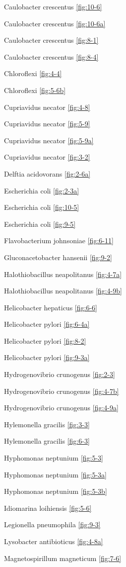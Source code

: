 \documentclass[]{tufte-book}
\begin{document}
Caulobacter crescentus \ref{fig:10-6}

Caulobacter crescentus \ref{fig:10-6a}

Caulobacter crescentus \ref{fig:8-1}

Caulobacter crescentus \ref{fig:8-4}

Chloroflexi \ref{fig:4-4}

Chloroflexi \ref{fig:5-6b}

Cupriavidus necator \ref{fig:4-8}

Cupriavidus necator \ref{fig:5-9}

Cupriavidus necator \ref{fig:5-9a}

Cupriavidus necator \ref{fig:3-2}

Delftia acidovorans \ref{fig:2-6a}

Escherichia coli \ref{fig:2-3a}

Escherichia coli \ref{fig:10-5}

Escherichia coli \ref{fig:9-5}

Flavobacterium johnsoniae \ref{fig:6-11}

Gluconacetobacter hansenii \ref{fig:9-2}

Halothiobacillus neapolitanus \ref{fig:4-7a}

Halothiobacillus neapolitanus \ref{fig:4-9b}

Helicobacter hepaticus \ref{fig:6-6}

Helicobacter pylori \ref{fig:6-4a}

Helicobacter pylori \ref{fig:8-2}

Helicobacter pylori \ref{fig:9-3a}

Hydrogenovibrio crunogenus \ref{fig:2-3}

Hydrogenovibrio crunogenus \ref{fig:4-7b}

Hydrogenovibrio crunogenus \ref{fig:4-9a}

Hylemonella gracilis \ref{fig:3-3}

Hylemonella gracilis \ref{fig:6-3}

Hyphomonas neptunium \ref{fig:5-3}

Hyphomonas neptunium \ref{fig:5-3a}

Hyphomonas neptunium \ref{fig:5-3b}

Idiomarina loihiensis \ref{fig:5-6}

Legionella pneumophila \ref{fig:9-3}

Lysobacter antibioticus \ref{fig:4-8a}

Magnetospirillum magneticum \ref{fig:7-6}
\end{document}
